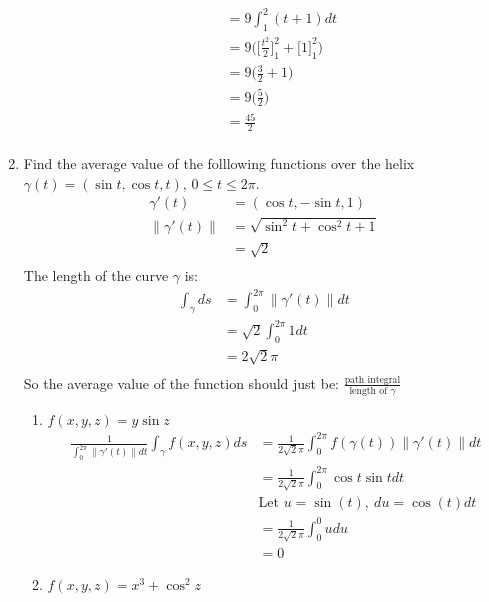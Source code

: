 \documentclass{article}
\newcommand{\norm}[1]{\| #1 \|}
\begin{document}
\begin{enumerate}
\begin{enumerate}
\begin{multicols}{2}
\begin{align*}
    \end{align*}
    \begin{align*} 
        &= 9 \int_1^2 (t + 1) dt \\ 
        &= 9 \Big( \Big[ \frac{t^2}{2} \Big]_1^2 + \Big[1\Big]_1^2 \Big) \\
        &= 9 \Big( \frac{3}{2} + 1 \Big) \\
        &= 9 \Big( \frac{5}{2} \Big) \\
        &= \frac{45}{2} \\
    \end{align*}
    \end{multicols}
\end{enumerate}
\newpage
\item Find the average value of the folllowing functions over the helix $\gamma(t) = (\sin t, \cos t, t)$, $0\leq t \leq 2\pi$.
\begin{align*}
    \gamma'(t) &= ( \cos t, - \sin t, 1) \\
    \norm{\gamma'(t)} &= \sqrt{ \sin^2t + \cos^2t +1} \\ 
    &= \sqrt{2} \\
\end{align*}
The length of the curve $\gamma$ is:
\begin{align*}
    \int_\gamma ds &= \int_0^{2\pi} \norm{\gamma'(t)} dt \\
    &= \sqrt{2} \int_0^{2\pi} 1 dt \\
    &= 2\sqrt{2}\pi \\
\end{align*}
So the average value of the function should just be: $\displaystyle \frac{\text{path integral}}{\text{length of }\gamma}$
\begin{enumerate}
    \item $f(x,y,z) = y\sin z$
    \begin{align*} 
        \frac{1}{\int_0^{2\pi} \norm{\gamma'(t)}dt}  \int_{\gamma}f(x,y,z)ds &= \frac{1}{2\sqrt{2}\pi} \int_0^{2\pi} f(\gamma(t)) \norm{\gamma'(t)}dt \\
        &= \frac{1}{2\sqrt{2}\pi} \int_0^{2\pi} \cos t \sin t dt \\
        &\text{Let } u = \sin(t),\: du = \cos(t)dt \\
        &= \frac{1}{2\sqrt{2}\pi} \int_0^0 udu \\
        &= 0
    \end{align*}
    \item $f(x,y,z) = x^3 + \cos^2 z$
    \begin{align*} 

\end{align*}
\end{enumerate}
\end{enumerate}
\end{document}
